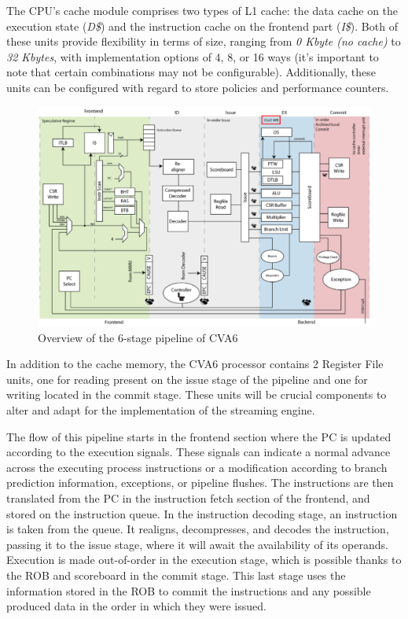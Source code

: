 The CPU's cache module comprises two types of L1 cache: the data cache on the execution state (\textit{D\$}) and the instruction cache on the frontend part (\textit{I\$}). Both of these units provide flexibility in terms of size, ranging from \textit{0 Kbyte (no cache)} to \textit{32 Kbytes}, with implementation options of 4, 8, or 16 ways (it's important to note that certain combinations may not be configurable). Additionally, these units can be configured with regard to store policies and performance counters.

\begin{figure}[H]
    \centering
    \includegraphics[width=0.75\linewidth]{images/cva6-simplified-overview.png}
    \caption{Overview of the 6-stage pipeline of CVA6}
    \label{fig:cva6-pipeline}
\end{figure}

In addition to the cache memory, the CVA6 processor contains 2 Register File units, one for reading present on the issue stage of the pipeline and one for writing located in the commit stage. These units will be crucial components to alter and adapt for the implementation of the streaming engine.

The flow of this pipeline starts in the frontend section where the \acrfull{PC} is updated according to the execution signals. These signals can indicate a normal advance across the executing process instructions or a modification according to branch prediction information, exceptions, or pipeline flushes. The instructions are then translated from the \acrshort{PC} in the instruction fetch section of the frontend, and stored on the instruction queue. In the instruction decoding stage, an instruction is taken from the queue. It realigns, decompresses, and decodes the instruction, passing it to the issue stage, where it will await the availability of its operands. Execution is made out-of-order in the execution stage, which is possible thanks to the \acrfull{ROB} and scoreboard in the commit stage. This last stage uses the information stored in the \acrshort{ROB} to commit the instructions and any possible produced data in the order in which they were issued.


